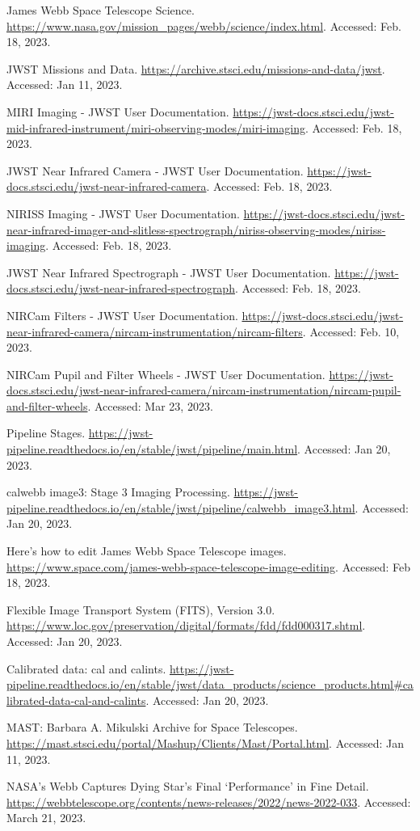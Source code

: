 \documentclass[10pt,twocolumn,letterpaper]{article}
\newcommand{\referencelink}[3]{\raggedright #1. \url{#2}. Accessed: #3.}
\begin{document}
\begin{thebibliography}{14}
\referencelink{James Webb Space Telescope Science}{https://www.nasa.gov/mission_pages/webb/science/index.html}{Feb. 18, 2023}

\referencelink{JWST Missions and Data}{https://archive.stsci.edu/missions-and-data/jwst}{Jan 11, 2023}

\referencelink{MIRI Imaging - JWST User Documentation}{https://jwst-docs.stsci.edu/jwst-mid-infrared-instrument/miri-observing-modes/miri-imaging}{Feb. 18, 2023}

\referencelink{JWST Near Infrared Camera - JWST User Documentation}{https://jwst-docs.stsci.edu/jwst-near-infrared-camera}{Feb. 18, 2023}

\referencelink{NIRISS Imaging - JWST User Documentation}{https://jwst-docs.stsci.edu/jwst-near-infrared-imager-and-slitless-spectrograph/niriss-observing-modes/niriss-imaging}{Feb. 18, 2023}

\referencelink{JWST Near Infrared Spectrograph - JWST User Documentation}{https://jwst-docs.stsci.edu/jwst-near-infrared-spectrograph}{Feb. 18, 2023}

\referencelink{NIRCam Filters - JWST User Documentation}{https://jwst-docs.stsci.edu/jwst-near-infrared-camera/nircam-instrumentation/nircam-filters}{Feb. 10, 2023}

\referencelink{NIRCam Pupil and Filter Wheels - JWST User Documentation}{https://jwst-docs.stsci.edu/jwst-near-infrared-camera/nircam-instrumentation/nircam-pupil-and-filter-wheels}{Mar 23, 2023}

\referencelink{Pipeline Stages}{https://jwst-pipeline.readthedocs.io/en/stable/jwst/pipeline/main.html}{Jan 20, 2023}

\referencelink{calwebb image3: Stage 3 Imaging Processing}{https://jwst-pipeline.readthedocs.io/en/stable/jwst/pipeline/calwebb_image3.html}{Jan 20, 2023}

\referencelink{Here's how to edit James Webb Space Telescope images}{https://www.space.com/james-webb-space-telescope-image-editing}{Feb 18, 2023}

\referencelink{Flexible Image Transport System (FITS), Version 3.0}{https://www.loc.gov/preservation/digital/formats/fdd/fdd000317.shtml}{Jan 20, 2023}

\referencelink{Calibrated data: cal and calints}{https://jwst-pipeline.readthedocs.io/en/stable/jwst/data_products/science_products.html\#calibrated-data-cal-and-calints}{Jan 20, 2023}

\referencelink{MAST: Barbara A. Mikulski Archive for Space Telescopes}{https://mast.stsci.edu/portal/Mashup/Clients/Mast/Portal.html}{Jan 11, 2023}

\referencelink{NASA's Webb Captures Dying Star's Final `Performance' in Fine Detail}{https://webbtelescope.org/contents/news-releases/2022/news-2022-033}{March 21, 2023}

\end{thebibliography}
\end{document}
